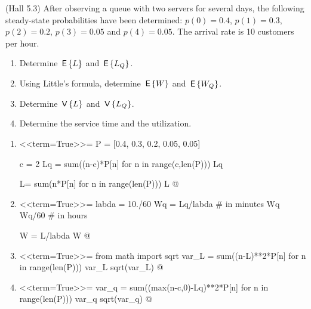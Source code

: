 \begin{question}(Hall 5.3) After observing a queue with two servers
  for several days, the following steady-state probabilities have been
  determined: $p(0)=0.4$, $p(1) = 0.3$, $p(2)=0.2$, $p(3)=0.05$ and
  $p(4)=0.05$. The arrival rate is 10 customers per hour.
  \begin{enumerate}
  \item Determine $\,\mathsf{E}\left\{L\right\}$ and  $\,\mathsf{E}\left\{L_Q\right\}$. 
  \item Using Little's formula, determine $\,\mathsf{E}\left\{W\right\}$ and $\,\mathsf{E}\left\{W_Q\right\}$. 
  \item Determine $\,\mathsf{V}\left\{L\right\}$ and $\,\mathsf{V}\left\{L_Q\right\}$.
  \item Determine the service time and the utilization.
  \end{enumerate}

  \begin{solution}
    \begin{enumerate}
    \item 
<<term=True>>=
P = [0.4, 0.3, 0.2, 0.05, 0.05]

c = 2
Lq = sum((n-c)*P[n] for n in range(c,len(P)))
Lq

L= sum(n*P[n] for n in range(len(P)))
L
@

\item 
<<term=True>>=
labda = 10./60
Wq = Lq/labda # in minutes
Wq
Wq/60 # in hours

W = L/labda
W
@ 

\item 
<<term=True>>=
from math import sqrt
var_L = sum((n-L)**2*P[n] for n in range(len(P)))
var_L
sqrt(var_L)
@ 

\item 
<<term=True>>=
var_q = sum((max(n-c,0)-Lq)**2*P[n] for n in range(len(P)))
var_q
sqrt(var_q)
@

  \end{enumerate}
    \end{solution}
\end{question}  

